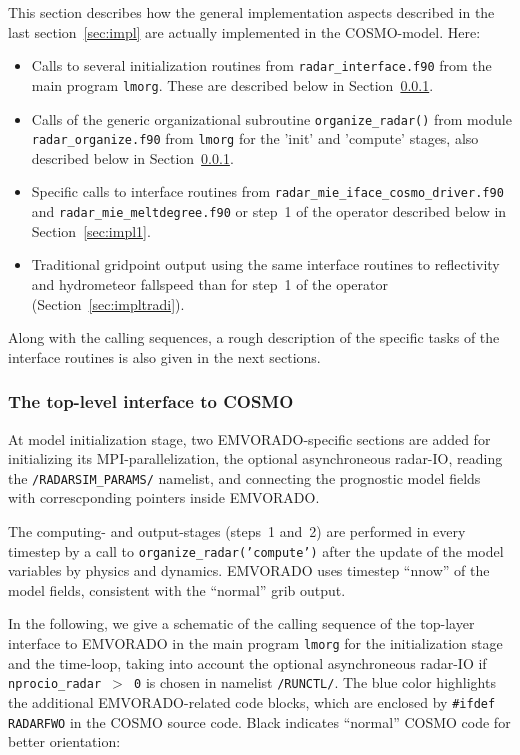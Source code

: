 \documentclass[10pt,a4paper,twoside,headinclude,footinclude,parskip=half]{scrartcl}
\newcommand{\myaktuellesection}{sec:intro}%
\newcommand{\labelsec}[1]{\label{#1}\renewcommand{\myaktuellesection}{#1}}%
\newcommand{\labelsec}[1]{\label{#1}}%
\newcommand{\srcform}[1]{\mbox{\texttt{#1}}\xspace}%
\begin{document}
This section describes how the general implementation aspects described in the last section~\ref{sec:impl}
are actually implemented in the COSMO-model. Here:
\begin{itemize}
\item Calls to several initialization routines from \srcform{radar_interface.f90} from
  the main program \srcform{lmorg}. These are described below in Section~\ref{sec:impltop}.
\item Calls of the generic organizational subroutine \srcform{organize_radar()} from module \srcform{radar_organize.f90}
  from \srcform{lmorg} for the 'init' and 'compute' stages, also described below in Section~\ref{sec:impltop}.
\item Specific calls to interface routines from \srcform{radar_mie_iface_cosmo_driver.f90} and \srcform{radar_mie_meltdegree.f90} or step~1 of the operator described below in Section~\ref{sec:impl1}.
\item Traditional gridpoint output using the same interface routines to reflectivity and hydrometeor
  fallspeed than for step~1 of the operator (Section~\ref{sec:impltradi}).
\end{itemize}
Along with the calling sequences, a rough description of the specific tasks of
the interface routines is also given in the next sections.


\subsubsection{The top-level interface to COSMO}

\labelsec{sec:impltop}

At model initialization stage, two EMVORADO-specific sections are added for initializing
its MPI-parallelization, the optional asynchroneous radar-IO, reading the \srcform{/RADARSIM_PARAMS/} namelist,
and connecting the prognostic model fields with correscponding pointers inside EMVORADO.

The computing- and output-stages (steps~1 and~2) are performed in every timestep by a call to \srcform{organize_radar('compute')}
after the update of the model variables by physics and dynamics. EMVORADO uses timestep ``nnow'' of the model fields, consistent with the ``normal'' grib output.

In the following, we give a schematic of the calling sequence of the top-layer interface to EMVORADO in the main program \srcform{lmorg}
for the initialization stage and the time-loop, taking into account the optional asynchroneous radar-IO if
\srcform{nprocio_radar~$>$ 0} is chosen in namelist \srcform{/RUNCTL/}. The blue color highlights the
additional EMVORADO-related code blocks, which are enclosed by \srcform{\#ifdef RADARFWO} in the COSMO source code. Black indicates ``normal'' COSMO code for better orientation:
\end{document}
